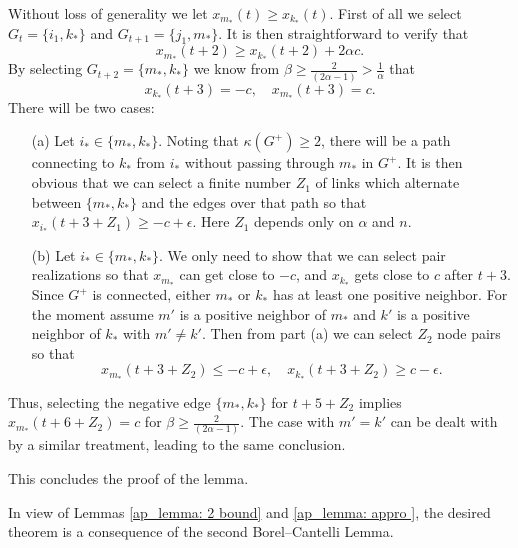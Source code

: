 Without loss of generality we let \(x_{m_*}(t) \geq x_{k_*}(t)\). First of all we select \(G_t = \{i_1, k_*\}\) and \(G_{t+1} = \{j_1, m_*\}\). It is then straightforward to verify that
\[
x_{m_*}(t + 2) \geq x_{k_*}(t + 2) + 2\alpha c.
\]
By selecting \(G_{t+2} = \{m_*, k_*\}\) we know from \(\beta \geq \frac{2}{(2\alpha - 1)} > \frac{1}{\alpha}\) that
\[
x_{k_*}(t + 3) = -c, \quad x_{m_*}(t + 3) = c.
\]
There will be two cases:
\begin{itemize}
    \item[(a)] Let \(i_* \in \{m_*, k_*\}\). Noting that \(\kappa(G^+) \geq 2\), there will be a path connecting to \(k_*\) from \(i_*\) without passing through \(m_*\) in \(G^+\). It is then obvious that we can select a finite number \(Z_1\) of links which alternate between \(\{m_*, k_*\}\) and the edges over that path so that \(x_{i_*}(t + 3 + Z_1) \geq -c + \epsilon\). Here \(Z_1\) depends only on \(\alpha\) and \(n\).
    \item[(b)] Let \(i_* \in \{m_*, k_*\}\). We only need to show that we can select pair realizations so that \(x_{m_*}\) can get close to \(-c\), and \(x_{k_*}\) gets close to \(c\) after \(t + 3\). Since \(G^+\) is connected, either \(m_*\) or \(k_*\) has at least one positive neighbor. For the moment assume \(m'\) is a positive neighbor of \(m_*\) and \(k'\) is a positive neighbor of \(k_*\) with \(m' \neq k'\). Then from part (a) we can select \(Z_2\) node pairs so that
    \[
    x_{m_*}(t + 3 + Z_2) \leq -c + \epsilon, \quad x_{k_*}(t + 3 + Z_2) \geq c - \epsilon.
    \]
\end{itemize}
Thus, selecting the negative edge \(\{m_*, k_*\}\) for \(t + 5 + Z_2\) implies \(x_{m_*}(t + 6 + Z_2) = c\) for \(\beta \geq \frac{2}{(2\alpha - 1)}\). The case with \(m' = k'\) can be dealt with by a similar treatment, leading to the same conclusion.

This concludes the proof of the lemma.

In view of Lemmas \ref{ap_lemma: 2 bound} and \ref{ap_lemma: appro }, the desired theorem is a consequence of the second Borel--Cantelli Lemma.

\section{}
\label{app: oversmoothing of theorem 4.1 and 4.3}


